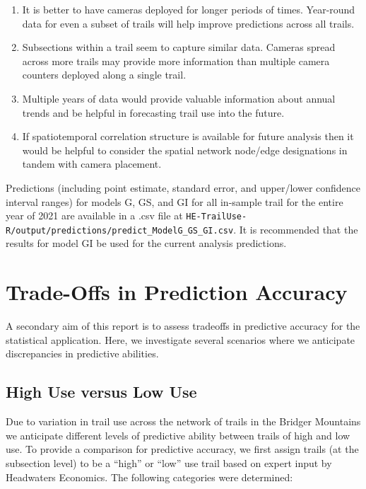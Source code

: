 \documentclass[
]{book}
\providecommand{\tightlist}{%
  \setlength{\itemsep}{0pt}\setlength{\parskip}{0pt}}
\begin{document}
\begin{enumerate}
\def\labelenumi{\arabic{enumi}.}
\tightlist
\item
  It is better to have cameras deployed for longer periods of times. Year-round data for even a subset of trails will help improve predictions across all trails.
\item
  Subsections within a trail seem to capture similar data. Cameras spread across more trails may provide more information than multiple camera counters deployed along a single trail.
\item
  Multiple years of data would provide valuable information about annual trends and be helpful in forecasting trail use into the future.
\item
  If spatiotemporal correlation structure is available for future analysis then it would be helpful to consider the spatial network node/edge designations in tandem with camera placement.
\end{enumerate}

Predictions (including point estimate, standard error, and upper/lower confidence interval ranges) for models G, GS, and GI for all in-sample trail for the entire year of 2021 are available in a .csv file at \texttt{HE-TrailUse-R/output/predictions/predict\_ModelG\_GS\_GI.csv}. It is recommended that the results for model GI be used for the current analysis predictions.

\hypertarget{TradeOff}{%
\chapter{Trade-Offs in Prediction Accuracy}\label{TradeOff}}

A secondary aim of this report is to assess tradeoffs in predictive accuracy for the statistical application. Here, we investigate several scenarios where we anticipate discrepancies in predictive abilities.

\hypertarget{high-use-versus-low-use}{%
\section{High Use versus Low Use}\label{high-use-versus-low-use}}

Due to variation in trail use across the network of trails in the Bridger Mountains we anticipate different levels of predictive ability between trails of high and low use. To provide a comparison for predictive accuracy, we first assign trails (at the subsection level) to be a ``high'' or ``low'' use trail based on expert input by Headwaters Economics. The following categories were determined:
\end{document}
